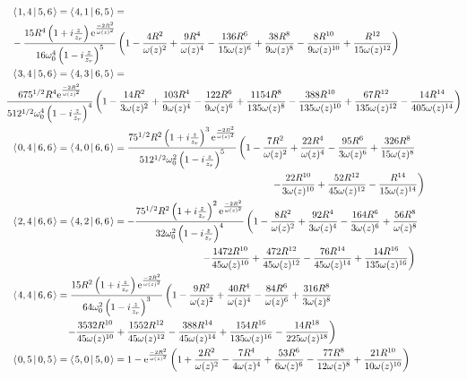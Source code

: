 \documentclass[11pt]{amsart}
\makeatletter
\newcommand{\e}{{\rm e}}				%
\newcommand{\msp}[1]{\mspace{#1mu}}		%
\newcommand{\0}{\varnothing}		%
\newcommand{\brac}[2]{\left\langle\msp{2} #1\left\lvert \msp{3.5} #2 \right.\right\rangle}	%
\newcommand{\1}{!}
\newcommand{\2}{@}
\newcommand{\3}{\#}
\newcommand{\4}{\$}
\newcommand{\5}{\%}
\newcommand{\6}{$^\wedge$}
\newcommand{\7}{\&}
\newcommand{\8}{*}
\newcommand{\9}{(}
\makeatother
\begin{document}
\begin{align*}
&
\brac{1,4}{5,6} =\brac{4,1}{6,5} =
\\
&
-\frac{15R^4\left(1+i\frac{z}{z_r}\right)\e^{\frac{-2R^2}{\omega(z)^2}}}{16\omega_0^4\left(1-i\frac{z}{z_r}\right)^5}\left(1-\frac{4R^2}{\omega(z)^2}+\frac{9R^4}{\omega(z)^4}-\frac{136R^6}{15\omega(z)^6}+\frac{38R^8}{9\omega(z)^8}-\frac{8R^{10}}{9\omega(z)^{10}}+\frac{R^{12}}{15\omega(z)^{12}}\right)
\\
&
\brac{3,4}{5,6} = \brac{4,3}{6,5} = 
\\
&
\msp{-10}\frac{675^{1/2}R^4\e^{\frac{-2R^2}{\omega(z)^2}}}{512^{1/2}\omega_0^4\left(1-i\frac{z}{z_r}\right)^4}\left(1-\frac{14R^2}{3\omega(z)^2}+\frac{103R^4}{9\omega(z)^4}-\frac{122R^6}{9\omega(z)^6}+\frac{1154R^8}{135\omega(z)^8}-\frac{388R^{10}}{135\omega(z)^{10}}+\frac{67R^{12}}{135\omega(z)^{12}}-\frac{14R^{14}}{405\omega(z)^{14}}\right)
\\
&
\brac{0,4}{6,6} = \brac{4,0}{6,6} = \frac{75^{1/2}R^2\left(1+i\frac{z}{z_r}\right)^3\e^{\frac{-2R^2}{\omega(z)^2}}}{512^{1/2}\omega_0^2\left(1-i\frac{z}{z_r}\right)^5}\left(1-\frac{7R^2}{\omega(z)^2}+\frac{22R^4}{\omega(z)^4}-\frac{95R^6}{3\omega(z)^6}+\frac{326R^8}{15\omega(z)^8}\right.
\\
&
\msp{480}\left.-\frac{22R^{10}}{3\omega(z)^{10}}+\frac{52R^{12}}{45\omega(z)^{12}}-\frac{R^{14}}{15\omega(z)^{14}}\right)
\\
&
\brac{2,4}{6,6} = \brac{4,2}{6,6} = -\frac{75^{1/2}R^2\left(1+i\frac{z}{z_r}\right)^2\e^{\frac{-2R^2}{\omega(z)^2}}}{32\omega_0^2\left(1-i\frac{z}{z_r}\right)^4}\left(1-\frac{8R^2}{\omega(z)^2}+\frac{92R^4}{3\omega(z)^4}-\frac{164R^6}{3\omega(z)^6}+\frac{56R^8}{\omega(z)^8}
\right.
\\
&
\msp{350}\left.-\frac{1472R^{10}}{45\omega(z)^{10}}+\frac{472R^{12}}{45\omega(z)^{12}}-\frac{76R^{14}}{45\omega(z)^{14}}+\frac{14R^{16}}{135\omega(z)^{16}}\right)
\\
&
\brac{4,4}{6,6} = \frac{15R^2\left(1+i\frac{z}{z_r}\right)\e^{\frac{-2R^2}{\omega(z)^2}}}{64\omega_0^2\left(1-i\frac{z}{z_r}\right)^3}\left(1-\frac{9R^2}{\omega(z)^2}+\frac{40R^4}{\omega(z)^4}-\frac{84R^6}{\omega(z)^6}+\frac{316R^8}{3\omega(z)^8}\right.
\\
&
\msp{100}\left.-\frac{3532R^{10}}{45\omega(z)^{10}}+\frac{1552R^{12}}{45\omega(z)^{12}}-\frac{388R^{14}}{45\omega(z)^{14}}+\frac{154R^{16}}{135\omega(z)^{16}}-\frac{14R^{18}}{225\omega(z)^{18}}\right)
\\
&
\brac{0,5}{0,5} = \brac{5,0}{5,0} = 1-\e^{\frac{-2R^2}{\omega(z)^2}}\left(1+\frac{2R^2}{\omega(z)^2}-\frac{7R^4}{4\omega(z)^4}+\frac{53R^6}{6\omega(z)^6}-\frac{77R^8}{12\omega(z)^8}+\frac{21R^{10}}{10\omega(z)^{10}}\right)

\end{align*}
\end{document}
